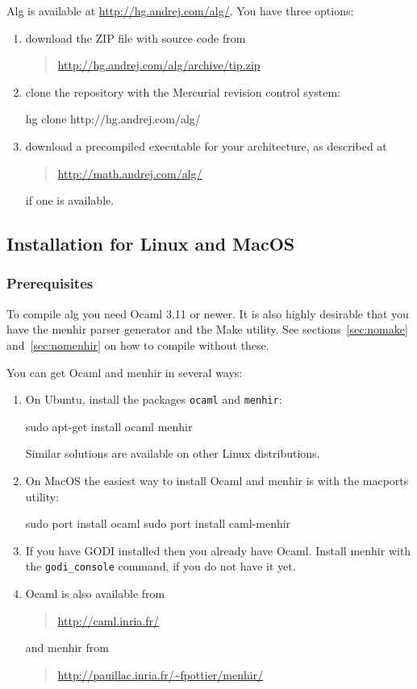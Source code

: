 \documentclass{article}
\begin{document}
Alg is available at \url{http://hg.andrej.com/alg/}. You have three
options:
%
\begin{enumerate}
\item download the ZIP file with source code from
  \begin{quote}
    \url{http://hg.andrej.com/alg/archive/tip.zip}
  \end{quote}
\item clone the repository with the Mercurial revision control system:
%
\begin{shell}
hg clone http://hg.andrej.com/alg/
\end{shell}
\item download a precompiled executable for your architecture, as
  described at
  \begin{quote}
    \url{http://math.andrej.com/alg/}
  \end{quote}
  if one is available.
\end{enumerate}

\subsection{Installation for Linux and MacOS}
\label{sec:comp-under-linux}

\subsubsection{Prerequisites}

To compile alg you need Ocaml 3.11 or newer. It is also highly
desirable that you have the menhir parser generator and the Make
utility. See sections~\ref{sec:nomake} and~\ref{sec:nomenhir} on how
to compile without these.

You can get Ocaml and menhir in several ways:
%
\begin{enumerate}
\item On Ubuntu, install the packages \texttt{ocaml} and
  \texttt{menhir}:
\begin{shell}
sudo apt-get install ocaml menhir    
\end{shell}
  Similar solutions are available on other Linux distributions.
\item On MacOS the easiest way to install Ocaml and menhir is with
  the macports utility:
\begin{shell}
sudo port install ocaml
sudo port install caml-menhir
\end{shell}
\item If you have GODI installed then you already have Ocaml. Install
  menhir with the \texttt{godi\_console} command, if you do not have it yet.
\item Ocaml is also available from
  \begin{quote}
    \url{http://caml.inria.fr/}
  \end{quote}
  and menhir from
  \begin{quote}
    \url{http://pauillac.inria.fr/~fpottier/menhir/}
  \end{quote}
\end{enumerate}
\end{document}
